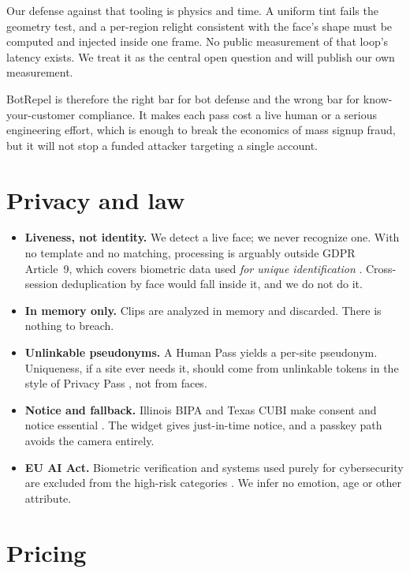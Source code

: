 \documentclass[11pt]{article}
\begin{document}
Our defense against that tooling is physics and time. A uniform tint fails the geometry test, and
a per-region relight consistent with the face's shape must be computed and injected inside one
frame. No public measurement of that loop's latency exists. We treat it as the central open
question and will publish our own measurement.

BotRepel is therefore the right bar for bot defense and the wrong bar for know-your-customer
compliance. It makes each pass cost a live human or a serious engineering effort, which is enough
to break the economics of mass signup fraud, but it will not stop a funded attacker targeting a
single account.

\section{Privacy and law}

\begin{itemize}
  \item \textbf{Liveness, not identity.} We detect a live face; we never recognize one. With no
        template and no matching, processing is arguably outside GDPR Article~9, which covers
        biometric data used \emph{for unique identification} \cite{edpb}. Cross-session
        deduplication by face would fall inside it, and we do not do it.
  \item \textbf{In memory only.} Clips are analyzed in memory and discarded. There is nothing to
        breach.
  \item \textbf{Unlinkable pseudonyms.} A Human Pass yields a per-site pseudonym. Uniqueness, if a
        site ever needs it, should come from unlinkable tokens in the style of Privacy Pass
        \cite{privacy-pass}, not from faces.
  \item \textbf{Notice and fallback.} Illinois BIPA and Texas CUBI make consent and notice
        essential \cite{bipa}. The widget gives just-in-time notice, and a passkey path avoids the
        camera entirely.
  \item \textbf{EU AI Act.} Biometric verification and systems used purely for cybersecurity are
        excluded from the high-risk categories \cite{ai-act}. We infer no emotion, age or other
        attribute.
\end{itemize}

\section{Pricing}
\end{document}
